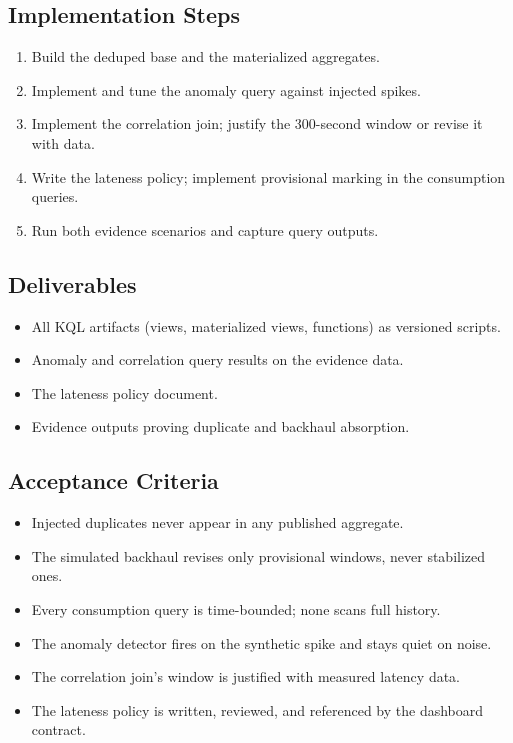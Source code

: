 \subsection*{Implementation Steps}
\begin{enumerate}
    \item Build the deduped base and the materialized aggregates.
    \item Implement and tune the anomaly query against injected spikes.
    \item Implement the correlation join; justify the 300-second window or revise it with data.
    \item Write the lateness policy; implement provisional marking in the consumption queries.
    \item Run both evidence scenarios and capture query outputs.
\end{enumerate}

\subsection*{Deliverables}
\begin{itemize}
    \item All KQL artifacts (views, materialized views, functions) as versioned scripts.
    \item Anomaly and correlation query results on the evidence data.
    \item The lateness policy document.
    \item Evidence outputs proving duplicate and backhaul absorption.
\end{itemize}

\subsection*{Acceptance Criteria}
\begin{itemize}
    \item[\(\square\)] Injected duplicates never appear in any published aggregate.
    \item[\(\square\)] The simulated backhaul revises only provisional windows, never stabilized ones.
    \item[\(\square\)] Every consumption query is time-bounded; none scans full history.
    \item[\(\square\)] The anomaly detector fires on the synthetic spike and stays quiet on noise.
    \item[\(\square\)] The correlation join's window is justified with measured latency data.
    \item[\(\square\)] The lateness policy is written, reviewed, and referenced by the dashboard contract.
\end{itemize}

